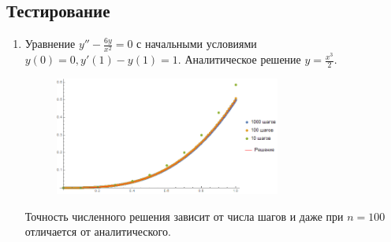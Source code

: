 \documentclass[a4paper,12pt,titlepage,finall]{article}
\begin{document}
\subsection{Тестирование}
\begin{enumerate}
\item
Уравнение $y'' - \frac{6y}{x^2} = 0$ с начальными условиями $y(0) = 0, y'(1) - y(1) = 1$. Аналитическое решение $y = \frac{x^3}{2}$.
\begin{figure}[h]
\centering
\includegraphics[width=0.7\textwidth]{test_2_1.png}
\end{figure}
\par
Точность численного решения зависит от числа шагов и даже при $n = 100$ отличается от аналитического.


\end{enumerate}
\end{document}
